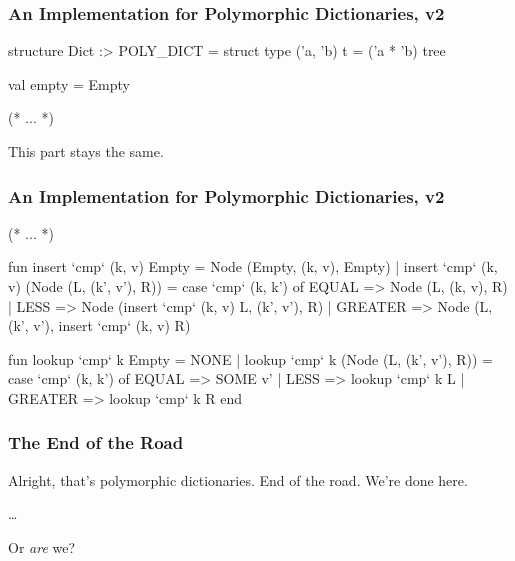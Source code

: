 \documentclass[aspectratio=169, handout]{beamer}
\begin{document}
\begin{frame}[fragile]
  \frametitle{An Implementation for Polymorphic Dictionaries, v2}

  \begin{codeblock}
    structure Dict :> POLY_DICT =
      struct
        type ('a, 'b) t = ('a * 'b) tree

        val empty = Empty

        (* ... *)
  \end{codeblock}

  \vspace{\fill}

  This part stays the same.
\end{frame}

\begin{frame}[fragile]
  \frametitle{An Implementation for Polymorphic Dictionaries, v2}
  \small
  \begin{codeblock}
    (* ... *)

      fun insert `cmp` (k, v) Empty = Node (Empty, (k, v), Empty)
        | insert `cmp` (k, v) (Node (L, (k', v'), R)) =
            case `cmp` (k, k') of
              EQUAL   => Node (L, (k, v), R)
            | LESS    => Node (insert `cmp` (k, v) L, (k', v'), R)
            | GREATER => Node (L, (k', v'), insert `cmp` (k, v) R)

      fun lookup `cmp` k Empty = NONE
        | lookup `cmp` k (Node (L, (k', v'), R)) =
            case `cmp` (k, k') of
              EQUAL   => SOME v'
            | LESS    => lookup `cmp` k L
            | GREATER => lookup `cmp` k R
    end
  \end{codeblock}
\end{frame}

\begin{frame}[fragile]
  \frametitle{The End of the Road}

  Alright, that's polymorphic dictionaries. End of the road. We're done here.

  \pause
  \vspace{\fill}

  \dots

  \pause
  \vspace{\fill}

  Or \textit{are} we?
\end{frame}
\end{document}
